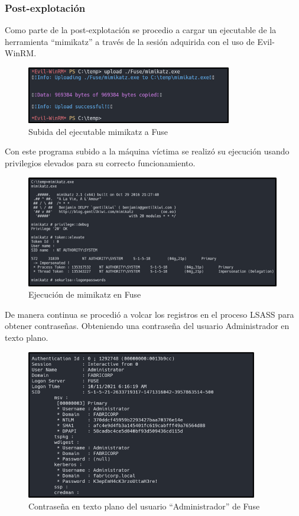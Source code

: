 \subsubsection{Post-explotación}
Como parte de la post-explotación se procedio a cargar un ejecutable de la herramienta “mimikatz” a través de la sesión adquirida con el uso de Evil-WinRM.
\begin{figure}[H]
    \centering
    \includegraphics[width=0.8\textwidth]{imagenes/submifuse.png}
    \caption{Subida del ejecutable mimikatz a Fuse}
\end{figure}
Con este programa subido a la máquina víctima se realizó su ejecución usando privilegios elevados para su correcto funcionamiento.
\begin{figure}[H]
    \centering
    \includegraphics[width=0.99\textwidth]{imagenes/ejmifuse.png}
    \caption{Ejecución de mimikatz en Fuse}
\end{figure}
\clearpage
De manera continua se procedió a volcar los registros en el proceso LSASS para obtener contraseñas. Obteniendo una contraseña del usuario Administrador en texto plano.
\begin{figure}[H]
    \centering
    \includegraphics[width=0.9\textwidth]{imagenes/conadfuse.png}
    \caption{Contraseña en texto plano del usuario ``Administrador'' de Fuse}
\end{figure}
